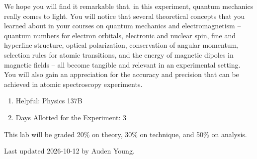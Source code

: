 \documentclass{../lab}
\begin{document}
We hope you will find it remarkable that, in this experiment, quantum mechanics really comes to light.  You will notice that several theoretical concepts that you learned about in your courses on quantum mechanics and electromagnetism -- quantum numbers for electron orbitals, electronic and nuclear spin,  fine and hyperfine structure, optical polarization, conservation of angular momentum, selection rules for atomic transitions, and the energy of magnetic dipoles in magnetic fields -- all become tangible and relevant in an experimental setting.  You will also gain an appreciation for the accuracy and precision that can be achieved in atomic spectroscopy experiments.


\begin{enumerate}
    \item Helpful: Physics 137B

  \item Days Allotted for the Experiment: 3

\end{enumerate}

This lab will be graded 20\% on theory, 30\% on technique, and 50\% on analysis. 

Last updated 2026-10-12 by Auden Young.


\end{document}
